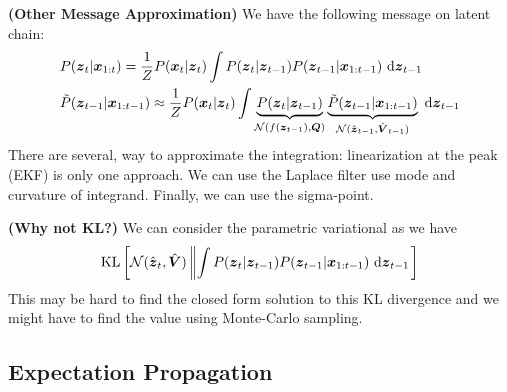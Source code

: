 \begin{remark}{\textbf{(Other Message Approximation)}}
    We have the following message on latent chain:
    \begin{equation*}
    \begin{aligned}
        &P(\boldsymbol z_t | \boldsymbol x_{1:t}) = \frac{1}{Z}P(\boldsymbol x_t | \boldsymbol z_t) \int P(\boldsymbol z_t|\boldsymbol z_{t-1})P(\boldsymbol z_{t-1}|\boldsymbol x_{1:t-1})\ \mathrm{d} \boldsymbol z_{t-1} \\
        &\tilde{P}(\boldsymbol z_{t-1} | \boldsymbol x_{1:t-1}) \approx \frac{1}{Z}P(\boldsymbol x_t | \boldsymbol z_t)\int \underbrace{P(\boldsymbol z_t | \boldsymbol z_{t-1})}_{\mathcal{N}(f(\boldsymbol z_{t-1}), \boldsymbol Q)}\underbrace{\tilde{P}(\boldsymbol z_{t-1} | \boldsymbol x_{1:t-1})}_{\mathcal{N}(\hat{\boldsymbol z}_{t-1}, \hat{\boldsymbol V}_{t-1})}\ \mathrm{d} \boldsymbol z_{t-1}
    \end{aligned}
    \end{equation*}
    There are several, way to approximate the integration: linearization at the peak (EKF) is only one approach. We can use the Laplace filter use mode and curvature of integrand. Finally, we can use the sigma-point. 
\end{remark}

\begin{remark}{\textbf{(Why not KL?)}}
    We can consider the parametric variational as we have 
    \begin{equation*}
        \operatorname{KL}\left[ \mathcal{N}(\hat{\boldsymbol z}_t, \hat{\boldsymbol V}) \left\| \int P(\boldsymbol z_t|\boldsymbol z_{t-1})P(\boldsymbol z_{t-1}|\boldsymbol x_{1:t-1})\ \mathrm{d} \boldsymbol z_{t-1} \right. \right]
    \end{equation*}
    This may be hard to find the closed form solution to this KL divergence and we might have to find the value using Monte-Carlo sampling. 
\end{remark}

\subsection{Expectation Propagation}

